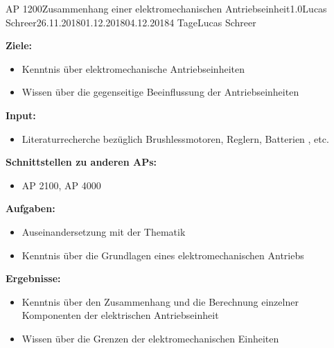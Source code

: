 \begin{appendix}
\clearpage
\begin{wpd}{AP 1200}{Zusammenhang einer elektromechanischen Antriebseinheit}{1.0}{Lucas Schreer}{26.11.2018}{01.12.2018}{04.12.2018}{4 Tage}{Lucas Schreer}
    {
    \textbf{Ziele:}
    \begin{itemize}
        \item Kenntnis über elektromechanische Antriebseinheiten
        \item Wissen über die gegenseitige Beeinflussung der Antriebseinheiten
    \end{itemize}
    \textbf{Input:}
    \begin{itemize}
        \item Literaturrecherche bezüglich Brushlessmotoren, Reglern, Batterien , etc.
    \end{itemize}
    \textbf{Schnittstellen zu anderen APs:}
    \begin{itemize}
        \item AP 2100, AP 4000
    \end{itemize}
    \textbf{Aufgaben:}
    \begin{itemize}
        \item Auseinandersetzung mit der Thematik 
        \item Kenntnis über die Grundlagen eines elektromechanischen Antriebs        
    \end{itemize}
    \textbf{Ergebnisse:}
    \begin{itemize}
        \item Kenntnis über den Zusammenhang und die Berechnung einzelner Komponenten der elektrischen Antriebseinheit
        \item Wissen über die Grenzen der elektromechanischen Einheiten
    \end{itemize}
    }
\end{wpd}



\end{appendix}
